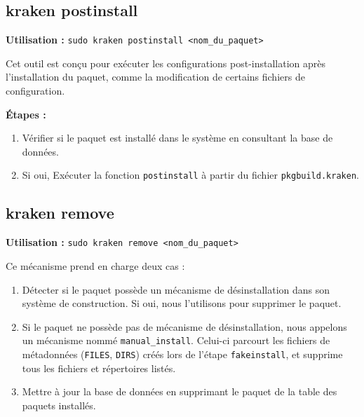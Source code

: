 




\subsection{kraken postinstall}

\textbf{Utilisation :} \texttt{sudo kraken postinstall <nom\_du\_paquet>}

Cet outil est conçu pour exécuter les configurations post-installation après l’installation du paquet, comme la modification de certains fichiers de configuration.

\textbf{Étapes :}
\begin{enumerate}
  \item Vérifier si le paquet est installé dans le système en consultant la base de données.
  \item Si oui, Exécuter la fonction \texttt{postinstall} à partir du fichier \texttt{pkgbuild.kraken}.
\end{enumerate}



\subsection{kraken remove}

\textbf{Utilisation :} \texttt{sudo kraken remove <nom\_du\_paquet>}

Ce mécanisme prend en charge deux cas :

\begin{enumerate}
  \item Détecter si le paquet possède un mécanisme de désinstallation dans son système de construction. Si oui, nous l’utilisons pour supprimer le paquet.
  \item Si le paquet ne possède pas de mécanisme de désinstallation, nous appelons un mécanisme nommé \texttt{manual\_install}. Celui-ci parcourt les fichiers de métadonnées (\texttt{FILES}, \texttt{DIRS}) créés lors de l’étape \texttt{fakeinstall}, et supprime tous les fichiers et répertoires listés.
  \item Mettre à jour la base de données en supprimant le paquet de la table des paquets installés.
\end{enumerate}



